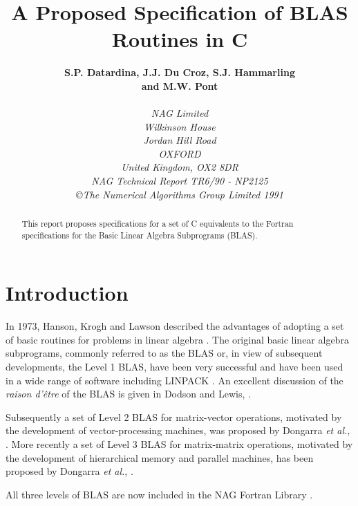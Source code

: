 

\title{A Proposed Specification of BLAS Routines in C}
\author{{\bf S.P. Datardina, J.J. Du Croz, S.J. Hammarling} \\
        {\bf and M.W. Pont} \\ \\
        {\it NAG Limited} \\
        {\it Wilkinson House} \\
        {\it Jordan Hill Road} \\
        {\it OXFORD} \\
        {\it United Kingdom, OX2 8DR} \\
        {\it NAG Technical Report TR6/90 - NP2125} \\
        {\it \copyright{The Numerical Algorithms Group Limited 1991}} }
\date{}
\maketitle

\begin{abstract}
This report proposes specifications for a set of C equivalents to the 
Fortran specifications for the Basic Linear Algebra Subprograms (BLAS).
\end{abstract}

\section{Introduction}
In 1973, Hanson, Krogh and Lawson described the advantages of adopting a
set of basic routines for problems in linear algebra \cite{HANSON}.  The 
original basic linear algebra subprograms, commonly referred to as the
BLAS or, in view of subsequent developments, the Level 1 BLAS, have been
very successful and have been used in a wide range of software including
LINPACK \cite{DONGAR1}.  An excellent discussion of the {\it raison
d'\^{e}tre} of the BLAS is given in Dodson and Lewis, \cite{DODSON}. 

Subsequently a set of Level 2 BLAS for matrix-vector operations,
motivated by the development of vector-processing machines, was proposed
by Dongarra {\it et al.}, \cite{DONGAR2}.  More recently a set of Level
3 BLAS for matrix-matrix operations, motivated by the development of
hierarchical memory and parallel machines, has been proposed by Dongarra
{\it et al.}, \cite{DONGAR3}. 

All three levels of BLAS are now included in the NAG Fortran Library
\cite{FLIB}. 


